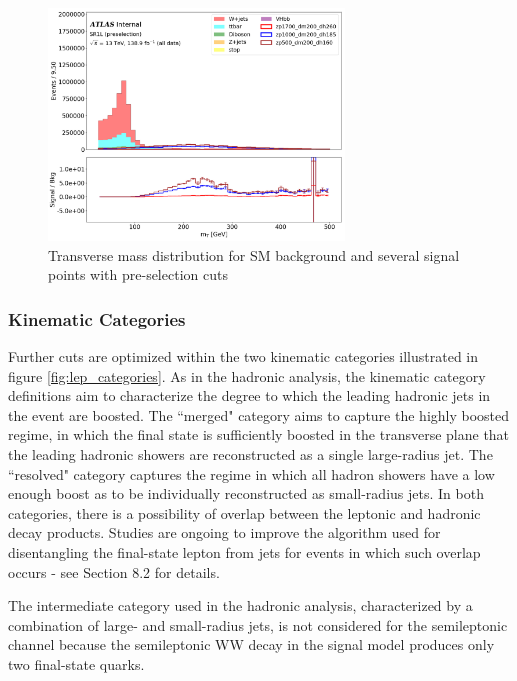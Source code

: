 \documentclass[12pt]{article}
\begin{document}
\begin{figure}[H]
	\centering
	\includegraphics[width=0.7\textwidth]{figures/mT_lep_met_preselection.png}
	\caption[]{Transverse mass distribution for SM background and several signal points with pre-selection cuts}
	\label{fig:mT_lep_met}
\end{figure}

\subsubsection{Kinematic Categories}

Further cuts are optimized within the two kinematic categories illustrated in figure \ref{fig:lep_categories}. As in the hadronic analysis, the kinematic category definitions aim to characterize the degree to which the leading hadronic jets in the event are boosted. The ``merged" category aims to capture the highly boosted regime, in which the final state is sufficiently boosted in the transverse plane that the leading hadronic showers are reconstructed as a single large-radius jet. The ``resolved" category captures the regime in which all hadron showers have a low enough boost as to be individually reconstructed as small-radius jets. In both categories, there is a possibility of overlap between the leptonic and hadronic decay products. Studies are ongoing to improve the algorithm used for disentangling the final-state lepton from jets for events in which such overlap occurs - see Section 8.2 for details. 

The intermediate category used in the hadronic analysis, characterized by a combination of large- and small-radius jets, is not considered for the semileptonic channel because the semileptonic WW decay in the signal model produces only two final-state quarks. 
\end{document}

